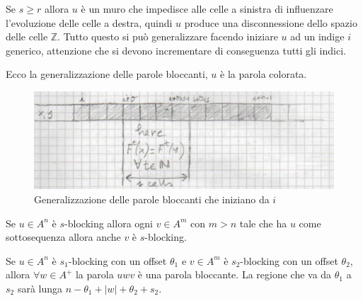 Se $s\ge r$ allora $u$ è un muro che impedisce alle celle a sinistra di influenzare 
l'evoluzione delle celle a destra, quindi $u$ produce una disconnessione dello 
spazio delle celle $\mathbb{Z}$. Tutto questo si può generalizzare facendo iniziare 
$u$ ad un indige $i$ generico, attenzione che si devono incrementare di conseguenza 
tutti gli indici.

\begin{nota}
    Ecco la generalizzazione delle parole bloccanti, $u$ è la parola colorata.
    \begin{figure}[!h]
        \centering
        \includegraphics[width=.7\textwidth]{img/sistemi_complessi/parola_bloccante.png}
        \caption{Generalizzazione delle parole bloccanti che iniziano da $i$}
        \label{fig:parola_bloccante}
    \end{figure}
\end{nota}

\begin{nota}
    Se $u\in A^n$ è $s$-blocking allora ogni $v\in A^m$ con $m>n$ tale che ha 
    $u$ come sottosequenza allora anche $v$ è $s$-blocking.
\end{nota}

\begin{nota}
    Se $u\in A^n$ è $s_1$-blocking con un offset $\theta_1$ e $v\in A^m$ è  $s_2$-blocking
    con un offset $\theta_2$, allora $\forall w \in A^+$ la parola $uwv$ è una parola 
    bloccante. 
    La regione che va da $\theta_1$ a $s_2$ sarà lunga $n - \theta_1 + | w | + \theta_2 + s_2$.
\end{nota}

